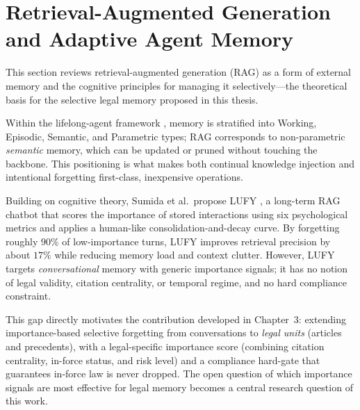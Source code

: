 \section{Retrieval-Augmented Generation and Adaptive Agent Memory}
\label{sec:ragmem}

This section reviews retrieval-augmented generation (RAG) as a form of external memory and the cognitive principles for managing it selectively---the theoretical basis for the selective legal memory proposed in this thesis.

Within the lifelong-agent framework \parencite{11328884}, memory is stratified into Working, Episodic, Semantic, and Parametric types; RAG corresponds to non-parametric \emph{semantic} memory, which can be updated or pruned without touching the backbone. This positioning is what makes both continual knowledge injection and intentional forgetting first-class, inexpensive operations.

Building on cognitive theory, Sumida et al.\ propose LUFY \parencite{Sumida_2025}, a long-term RAG chatbot that scores the importance of stored interactions using six psychological metrics and applies a human-like consolidation-and-decay curve. By forgetting roughly $90\%$ of low-importance turns, LUFY improves retrieval precision by about $17\%$ while reducing memory load and context clutter. However, LUFY targets \emph{conversational} memory with generic importance signals; it has no notion of legal validity, citation centrality, or temporal regime, and no hard compliance constraint.

This gap directly motivates the contribution developed in Chapter~3: extending importance-based selective forgetting from conversations to \emph{legal units} (articles and precedents), with a legal-specific importance score (combining citation centrality, in-force status, and risk level) and a compliance hard-gate that guarantees in-force law is never dropped. The open question of which importance signals are most effective for legal memory becomes a central research question of this work.
